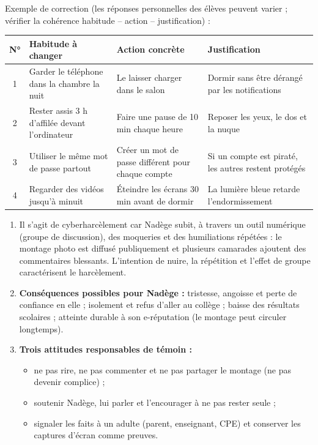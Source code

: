 \documentclass[11pt]{article}
\begin{document}
\begin{corrige}
Exemple de correction (les réponses personnelles des élèves peuvent varier ; vérifier la cohérence habitude -- action -- justification) :
\begin{center}
\begin{tabularx}{\linewidth}{|c|X|X|X|}
\hline
\rowcolor{popblueL} \textbf{N°} & \textbf{Habitude à changer} & \textbf{Action concrète} & \textbf{Justification} \\
\hline
1 & Garder le téléphone dans la chambre la nuit & Le laisser charger dans le salon & Dormir sans être dérangé par les notifications \\
\hline
2 & Rester assis 3 h d'affilée devant l'ordinateur & Faire une pause de 10 min chaque heure & Reposer les yeux, le dos et la nuque \\
\hline
3 & Utiliser le même mot de passe partout & Créer un mot de passe différent pour chaque compte & Si un compte est piraté, les autres restent protégés \\
\hline
4 & Regarder des vidéos jusqu'à minuit & Éteindre les écrans 30 min avant de dormir & La lumière bleue retarde l'endormissement \\
\hline
\end{tabularx}
\end{center}
\end{corrige}

\begin{corrige}
\begin{enumerate}
\item Il s'agit de cyberharcèlement car Nadège subit, à travers un outil numérique (groupe de discussion), des moqueries et des humiliations répétées : le montage photo est diffusé publiquement et plusieurs camarades ajoutent des commentaires blessants. L'intention de nuire, la répétition et l'effet de groupe caractérisent le harcèlement.
\item \textbf{Conséquences possibles pour Nadège :} tristesse, angoisse et perte de confiance en elle ; isolement et refus d'aller au collège ; baisse des résultats scolaires ; atteinte durable à son e-réputation (le montage peut circuler longtemps).
\item \textbf{Trois attitudes responsables de témoin :}
\begin{itemize}
\item ne pas rire, ne pas commenter et ne pas partager le montage (ne pas devenir complice) ;
\item soutenir Nadège, lui parler et l'encourager à ne pas rester seule ;
\item signaler les faits à un adulte (parent, enseignant, CPE) et conserver les captures d'écran comme preuves.
\end{itemize}
\end{enumerate}
\end{corrige}
\end{document}
